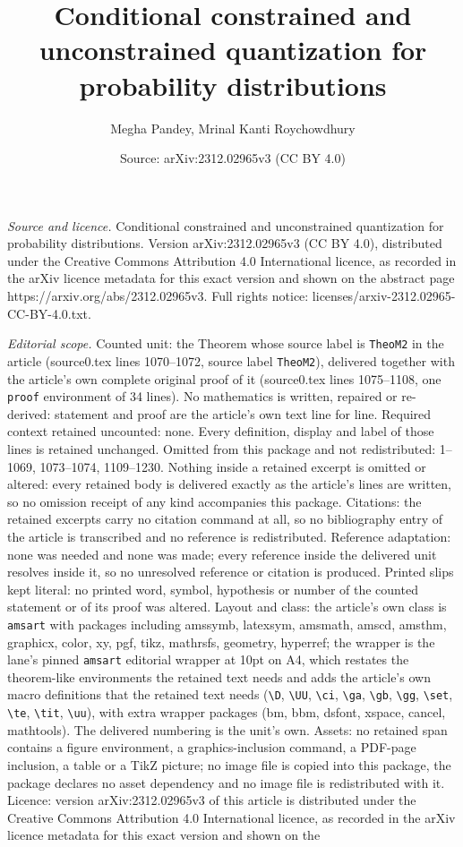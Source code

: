 \documentclass[10pt,a4paper]{amsart}
\title[Conditional constrained and unconstrained quantization for p]{Conditional constrained and unconstrained quantization for probability distributions}
\author{Megha Pandey, Mrinal Kanti Roychowdhury}
\date{Source: arXiv:2312.02965v3 (CC BY 4.0)}
\begin{document}
\maketitle

\noindent\emph{Source and licence.} Conditional constrained and unconstrained quantization for probability distributions. Version arXiv:2312.02965v3 (CC BY 4.0), distributed under the Creative Commons Attribution 4.0 International licence, as recorded in the arXiv licence metadata for this exact version and shown on the abstract page https://arxiv.org/abs/2312.02965v3. Full rights notice: licenses/arxiv-2312.02965-CC-BY-4.0.txt.\par\smallskip

\noindent\textit{Editorial scope.} Counted unit: the Theorem whose source label is \texttt{TheoM2} in the article (source0.tex lines 1070--1072, source label \texttt{TheoM2}), delivered together with the article's own complete original proof of it (source0.tex lines 1075--1108, one \texttt{proof} environment of 34 lines). No mathematics is written, repaired or re-derived: statement and proof are the article's own text line for line. Required context retained uncounted: none. Every definition, display and label of those lines is retained unchanged. Omitted from this package and not redistributed: 1--1069, 1073--1074, 1109--1230. Nothing inside a retained excerpt is omitted or altered: every retained body is delivered exactly as the article's lines are written, so no omission receipt of any kind accompanies this package. Citations: the retained excerpts carry no citation command at all, so no bibliography entry of the article is transcribed and no reference is redistributed. Reference adaptation: none was needed and none was made; every reference inside the delivered unit resolves inside it, so no unresolved reference or citation is produced. Printed slips kept literal: no printed word, symbol, hypothesis or number of the counted statement or of its proof was altered. Layout and class: the article's own class is \texttt{amsart} with packages including amssymb, latexsym, amsmath, amscd, amsthm, graphicx, color, xy, pgf, tikz, mathrsfs, geometry, hyperref; the wrapper is the lane's pinned \texttt{amsart} editorial wrapper at 10pt on A4, which restates the theorem-like environments the retained text needs and adds the article's own macro definitions that the retained text needs (\texttt{\textbackslash D}, \texttt{\textbackslash UU}, \texttt{\textbackslash ci}, \texttt{\textbackslash ga}, \texttt{\textbackslash gb}, \texttt{\textbackslash gg}, \texttt{\textbackslash set}, \texttt{\textbackslash te}, \texttt{\textbackslash tit}, \texttt{\textbackslash uu}), with extra wrapper packages (bm, bbm, dsfont, xspace, cancel, mathtools). The delivered numbering is the unit's own. Assets: no retained span contains a figure environment, a graphics-inclusion command, a PDF-page inclusion, a table or a TikZ picture; no image file is copied into this package, the package declares no asset dependency and no image file is redistributed with it. Licence: version arXiv:2312.02965v3 of this article is distributed under the Creative Commons Attribution 4.0 International licence, as recorded in the arXiv licence metadata for this exact version and shown on the 
\end{document}
